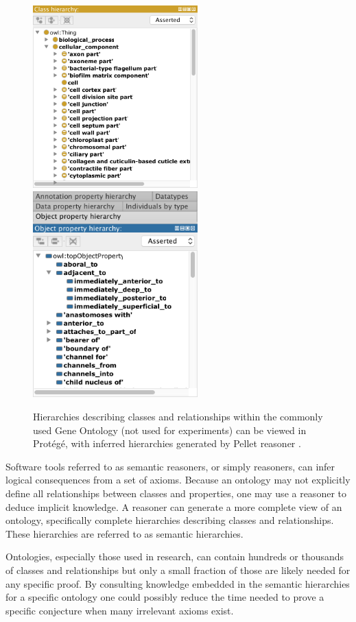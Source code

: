 \documentclass{article}
\begin{document}
\begin{figure}[h]
\centering
\includegraphics[width=2.5in]{class-hierarchy}
\includegraphics[width=2.5in]{object-property-hierarchy}
\caption[Semantic Hierarchies]{Hierarchies describing classes and relationships within the commonly used Gene Ontology (not used for experiments)  can be viewed in Prot{\'e}g{\'e}, with inferred hierarchies generated by Pellet reasoner \cite{gennari2003evolution}.}
\label{fig:class-hierarchy}
\end{figure}

Software tools referred to as semantic reasoners, or simply reasoners, can infer logical consequences from a set of axioms. Because an ontology may not explicitly define all relationships between classes and properties, one may use a reasoner to deduce implicit knowledge. A reasoner can generate a more complete view of an ontology, specifically complete hierarchies describing classes and relationships. These hierarchies are referred to as semantic hierarchies. 

Ontologies, especially those used in research, can contain hundreds or thousands of classes and relationships but only a small fraction of those are likely needed for any specific proof. By consulting knowledge embedded in the semantic hierarchies for a specific ontology one could possibly reduce the time needed to prove a specific conjecture when many irrelevant axioms exist. 
\end{document}
